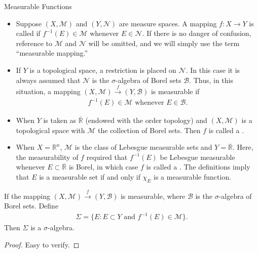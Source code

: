 \documentclass[../main.tex]{subfiles}
\begin{document}
\begin{definition}{Measurable Functions}{}
   \begin{itemize}
    \item  Suppose $(X, \mathcal{M})$ and $(Y, \mathcal{N})$ are measure spaces. A mapping $f: X \to Y$ is called  if
$f^{-1}(E) \in \mathcal{M} \text{ whenever } E \in \mathcal{N}.$
If there is no danger of confusion, reference to $\mathcal{M}$ and $\mathcal{N}$ will be omitted, and we will simply use the term ``measurable mapping.''
\item If $Y$ is a topological space, a restriction is placed on $\mathcal{N}$. In this case it is always assumed that $\mathcal{N}$ is the $\sigma$-algebra of Borel sets $\mathcal{B}$. Thus, in this situation, a mapping $(X,\mathcal{M}) \xrightarrow{f} (Y,\mathcal{B})$ is measurable if
\[\begin{aligned}
f^{-1}(E) \in \mathcal{M} \text{ whenever } E \in \mathcal{B}.
\end{aligned}\]
\item When $Y$ is taken as $\overline{\mathbb{R}}$ (endowed with the order topology) and $(X,\mathcal{M})$ is a topological space with $\mathcal{M}$ the collection of Borel sets. Then $f$ is called a . 
\item When $X = \mathbb{R}^n$, $\mathcal{M}$ is the class of Lebesgue measurable sets and $Y = \overline{\mathbb{R}}$. Here, the measurability of \(  f  \)  required that $f^{-1}(E)$ be Lebesgue measurable whenever $E \subset \overline{\mathbb{R}}$ is Borel, in which case $f$ is called a . The definitions imply that $E$ is a measurable set if and only if $\chi_E$ is a measurable function.

   \end{itemize}
   
\end{definition}

\begin{theorem}{}{}
    If the mapping $(X, \mathcal{M}) \xrightarrow{f} (Y, \mathcal{B})$ is measurable, where $\mathcal{B}$ is the $\sigma$-algebra of Borel sets.  Define
\[\begin{aligned}
\Sigma = \{E : E \subset Y \text{ and } f^{-1}(E) \in \mathcal{M}\}.
\end{aligned}\]Then \(   \Sigma   \) is a \(   \sigma   \)-algebra.  
\end{theorem}
\begin{proof}
    Easy to verify.
\end{proof}
\end{document}
